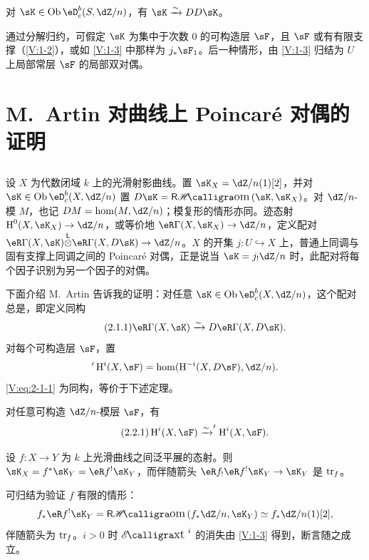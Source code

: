 \begin{theorem_}\label{V:1-4}
对 $\sK\in\ob\eD_c^b(S,\dZ/n)$，有 $\sK\iso DD\sK$。
\end{theorem_}
通过分解归约，可假定 $\sK$ 为集中于次数 $0$ 的可构造层 $\sF$，且 $\sF$ 或有有限支撑（\ref{V:1-2}），或如 \ref{V:1-3} 中那样为 $j_*\sF_1$。后一种情形，由 \ref{V:1-3} 归结为 $U$ 上局部常层 $\sF$ 的局部双对偶。

\section{M.\ Artin 对曲线上 Poincaré 对偶的证明}\label{V:2}
\subsection{}\label{V:2-1}
设 $X$ 为代数闭域 $k$ 上的光滑射影曲线。置 $\sK_X=\dZ/n(1)[2]$，并对 $\sK\in\ob\eD_c^b(X,\dZ/n)$ 置 $D\sK=\rHom(\sK,\sK_X)$。对 $\dZ/n$-模 $M$，也记 $DM=\hom(M,\dZ/n)$；模复形的情形亦同。迹态射 $\h^0(X,\sK_X)\to\dZ/n$，或等价地 $\eR\Gamma(X,\sK_X)\to\dZ/n$，定义配对
$\eR\Gamma(X,\sK)\lotimes\eR\Gamma(X,D\sK)\to\dZ/n$。$X$ 的开集 $j:U\hookrightarrow X$ 上，普通上同调与固有支撑上同调之间的 Poincaré 对偶，正是说当 $\sK=j_!\dZ/n$ 时，此配对将每个因子识别为另一个因子的对偶。

下面介绍 M.\ Artin 告诉我的证明：对任意 $\sK\in\ob\eD_c^b(X,\dZ/n)$，这个配对总是，即定义同构
\begin{equation*}\tag{2.1.1}\label{V:eq:2-1-1}
\eR\Gamma(X,\sK)\iso D\eR\Gamma(X,D\sK).
\end{equation*}
对每个可构造层 $\sF$，置
\[
'\h^i(X,\sF)=\hom(\h^{-i}(X,D\sF),\dZ/n).
\]
\eqref{V:eq:2-1-1} 为同构，等价于下述定理。

\begin{theorem_}\label{V:2-2}
对任意可构造 $\dZ/n$-模层 $\sF$，有
\begin{equation*}\tag{2.2.1}\label{V:eq:2-2-1}
\h^i(X,\sF)\iso'\h^i(X,\sF).
\end{equation*}
\end{theorem_}

\begin{lemma_}\label{V:2-3}
设 $f:X\to Y$ 为 $k$ 上光滑曲线之间泛平展的态射。则 $\sK_X=f^*\sK_Y=\eR f^!\sK_Y$，而伴随箭头 $\eR f_!\eR f^!\sK_Y\to\sK_Y$ 是 $\operatorname{tr}_f$。
\end{lemma_}
可归结为验证 $f$ 有限的情形：
\[
f_*\eR f^!\sK_Y=\rHom(f_*\dZ/n,\sK_Y)\simeq f_*\dZ/n(1)[2],
\]
伴随箭头为 $\operatorname{tr}_f$。$i>0$ 时 $\Ext^i$ 的消失由 \ref{V:1-3} 得到，断言随之成立。

